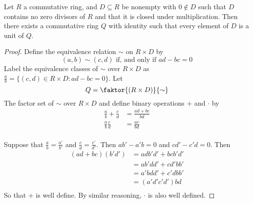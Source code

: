 \begin{theorem}\label{theorem_5.6.2}
  Let $R$ a commutative ring, and  $D \subseteq R$ be nonempty with $0 \notin
  D$ such that $D$ contains no zero divisors of $R$ and that it is closed
  under multiplication. Then there exists a commutative ring $Q$ with identity
  such that  every element of  $D$ is a unit of $Q$.
\end{theorem}
\begin{proof}
  Define the equivalence relation $\sim$ on  $R \times D$ by
  \begin{equation*}
    (a,b) \sim (c,d) \text{ if, and only if } ad-bc=0
  \end{equation*}
  Label the equivalence classes of $\sim$ over $R \times D$ as
  $\frac{a}{b}=\{(c,d) \in R \times D : ad-bc=0\}$. Let
  \begin{equation*}
    Q=\faktor{(R \times D)}{\sim}
  \end{equation*}
  The factor set of $\sim$ over $R \times D$ and define binary operations $+$
  and  $\cdot$ by
  \begin{align*}
    \frac{a}{b}+\frac{c}{d}     &=  \frac{ad+bc}{bd}    \\
    \frac{a}{b}\frac{c}{d}     &=  \frac{ac}{bd}    \\
  \end{align*}

  Suppose that $\frac{a}{b}=\frac{a'}{b'}$ and $\frac{c}{d}=\frac{c'}{d'}$.
  Then $ab'-a'b=0$ and  $cd'-c'd=0$. Then
  \begin{align*}
    (ad+bc)(b'd')       &=  adb'd'+bcb'd'  \\
                        &=  ab'dd'+cd'bb'   \\
                        &=  a'bdd'+c'dbb'   \\
                        &=  (a'd'c'd')bd    \\
  \end{align*}
  So that $+$ is well define. By similar reasoning,  $\cdot$ is also well
  defined.


\end{proof}

